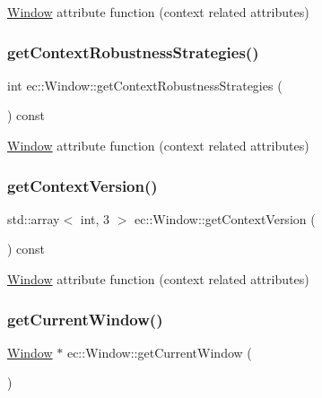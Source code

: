 \mbox{\hyperlink{classec_1_1_window}{Window}} attribute function (context related attributes) \mbox{\label{classec_1_1_window_aa5781c14b7d6d850a5435ba84f3d30e4}} 
\subsubsection{\texorpdfstring{get\+Context\+Robustness\+Strategies()}{getContextRobustnessStrategies()}}
{\footnotesize\ttfamily int ec\+::\+Window\+::get\+Context\+Robustness\+Strategies (\begin{DoxyParamCaption}{ }\end{DoxyParamCaption}) const}

\mbox{\hyperlink{classec_1_1_window}{Window}} attribute function (context related attributes) \mbox{\label{classec_1_1_window_a30d3b687a175f824e0a9ff00e25078d7}} 
\subsubsection{\texorpdfstring{get\+Context\+Version()}{getContextVersion()}}
{\footnotesize\ttfamily std\+::array$<$ int, 3 $>$ ec\+::\+Window\+::get\+Context\+Version (\begin{DoxyParamCaption}{ }\end{DoxyParamCaption}) const}

\mbox{\hyperlink{classec_1_1_window}{Window}} attribute function (context related attributes) \mbox{\label{classec_1_1_window_aca8cec4837055174791755b5bdef5949}} 
\subsubsection{\texorpdfstring{get\+Current\+Window()}{getCurrentWindow()}}
{\footnotesize\ttfamily \mbox{\hyperlink{classec_1_1_window}{Window}} $\ast$ ec\+::\+Window\+::get\+Current\+Window (\begin{DoxyParamCaption}{ }\end{DoxyParamCaption})\hspace{0.3cm}{\ttfamily [static]}}

